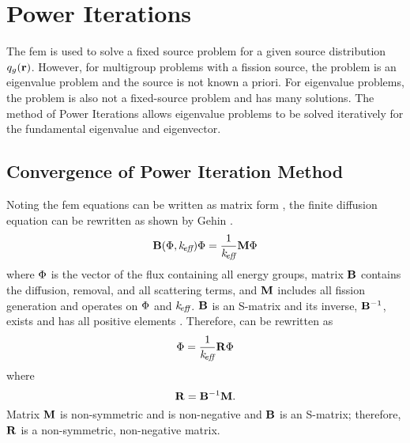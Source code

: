 \section{Power Iterations}
  \label{sec:power_iterations}
  The \gls{fem} is used to solve a fixed source problem for a given source
  distribution $q_g(\mathbf{r})$. However, for multigroup problems with a fission 
  source, the problem is an eigenvalue problem and the source is not known a 
  priori. For eigenvalue problems, the problem is also not a fixed-source 
  problem and has many solutions. The method of Power Iterations allows 
  eigenvalue problems to be solved iteratively for the fundamental eigenvalue 
  and eigenvector.

  \subsection{Convergence of Power Iteration Method}
    Noting the \gls{fem} equations can be written as matrix form
    , the finite diffusion equation can be rewritten as
    shown by Gehin \cite{gehinThesis}.
    \begin{equation}
      \label{eq:gehin_notation}
      \mathbf{B}(\Phi,k_{\!\mbox{\scriptsize \em eff}}) \Phi = \frac{1}{k_{\!\mbox{\scriptsize \em eff}}} \mathbf{M} \Phi
    \end{equation}
    where $\Phi$ is the vector of the flux containing all energy groups, matrix 
    $\mathbf{B}$ contains the diffusion, removal, and all scattering terms, and $\mathbf{M}$ 
    includes all fission generation and operates on $\Phi$ and $k_{\!\mbox{\scriptsize \em eff}}$. $\mathbf{B}$
    is an S-matrix and its inverse, $\mathbf{B}^{-1}$, exists and has all positive 
    elements \cite{nakamura}. Therefore,  can be 
    rewritten as
    \begin{equation}
      \label{eq:gehin_solution}
      \Phi = \frac{1}{k_{\!\mbox{\scriptsize \em eff}}} \mathbf{R} \Phi
    \end{equation}
    where
    \begin{equation}
      \label{eq:gehin_r}
      \mathbf{R} = \mathbf{B}^{-1} \mathbf{M}.
    \end{equation}
    Matrix $\mathbf{M}$ is non-symmetric and is non-negative and $\mathbf{B}$ is an S-matrix;
    therefore, $\mathbf{R}$ is a non-symmetric, non-negative matrix.

